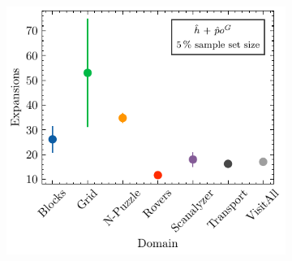 \documentclass[ppgc,diss,english]{iiufrgs}
\begin{document}
\begin{figure}
\begin{subfigure}{0.41\textwidth}
    \includegraphics[width=\linewidth]{img/error_hNN_poG_5pct.pdf}
  \end{subfigure}


  \vspace{0.5cm}


\end{figure}
\end{document}
